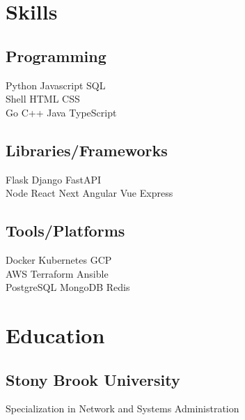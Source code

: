 \documentclass[]{plushcv}
\begin{document}
\begin{minipage}[t]{0.25\textwidth} 


\section{Skills}
\subsection{Programming}
\sectionsep
{}
Python \textbullet{} Javascript \textbullet{} SQL \textbullet{} \\
Shell \textbullet{} HTML \textbullet{} CSS  \\
\sectionsep
{}
Go \textbullet{} C++ \textbullet{} Java \textbullet{} TypeScript \\
\sectionsep
\sectionsep
\subsection{Libraries/Frameworks}
\sectionsep
Flask \textbullet{} Django \textbullet{} FastAPI \textbullet{}  \\
Node \textbullet{} React \textbullet{} Next \textbullet{} Angular \textbullet{} Vue \textbullet{} Express \\
\sectionsep
\sectionsep
\subsection{Tools/Platforms}
\sectionsep
Docker \textbullet{} Kubernetes \textbullet{} GCP \textbullet{} \\
AWS \textbullet{} Terraform \textbullet{} Ansible \textbullet{} \\
PostgreSQL \textbullet{} MongoDB \textbullet{} Redis \\

\sectionsep


\section{Education} 
\subsection{Stony Brook University}
Specialization in Network and Systems Administration \\


\end{minipage}
\end{document}
